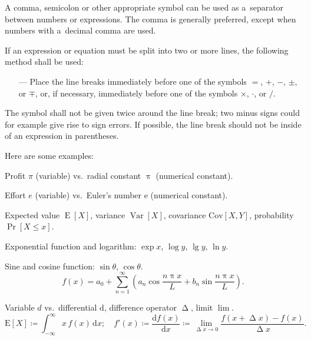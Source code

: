 \documentclass[12pt, a4paper, oneside]{article}
\newlength{\smalllinespacing}
\renewenvironment{quotation}{%
	\list{}{%
		\leftmargin = \baselineskip%
		\rightmargin = \leftmargin%
		\listparindent = \smalllinespacing%
		\parsep = 0pt%
		\baselineskip = \smalllinespacing%
	}%
	\item\relax%
}{%
	\endlist%
}
\newcommand{\dd}{\mathrm{d}}
\theoremstyle{Plain}
\theoremstyle{Definition}
\theoremstyle{Remark}
\begin{document}
\begin{quotation}
	A comma, semicolon or other appropriate symbol can be used as a~separator between numbers or expressions. The comma is generally preferred, except when numbers with a~decimal comma are used. \par
	If an expression or equation must be split into two or more lines, the following method shall be used:
	\begin{itemize}[leftmargin = \baselineskip, labelsep = 0.25\baselineskip]
		\item[---] Place the line breaks immediately before one of the symbols $=$, $+$, $-$, $\pm$, or $\mp$, or, if necessary, immediately before one of the symbols $\times$, $\cdot$, or $/$.
	\end{itemize}
	The symbol shall not be given twice around the line break; two minus signs could for example give rise to sign errors. If possible, the line break should not be inside of an expression in parentheses.
\end{quotation}

Here are some examples:
\begin{tcolorbox}[extras last = {bottom = -4ex}, extras unbroken = {bottom = -4ex}]
	\setlength{\parindent}{0pt}%
	Profit $\pi$ (variable) vs.\ radial constant $\uppi$ (numerical constant). \par
	Effort $e$ (variable) vs.\ Euler's number $\mathrm{e}$ (numerical constant). \par
	Expected value $\operatorname{E}[X]$, variance $\operatorname{Var}[X]$, covariance $\mathrm{Cov}[X, Y]$, probability $\Pr[{X \le x}]$. \par
	Exponential function and logarithm: $\exp x$, $\log y$, $\lg y$, $\ln y$. \par
	Sine and cosine function: $\sin \theta$, $\cos \theta$.
	\begin{equation}
		f(x) = a_0 + \sum_{n=1}^\infty \left(a_n \cos \frac{n \uppi x}{L} + b_n \sin \frac{n \uppi x}{L} \right).
	\end{equation} \par
	Variable $d$ vs.\ differential $\dd$, difference operator $\upDelta$, limit $\lim$.
	\begin{equation}
		\mathrm{E}[X] \coloneq \int_{-\infty}^{\infty} x\,f(x)\,\dd x; \quad
		f'(x) \coloneq \frac{\dd f(x)}{\dd x} \coloneq \lim_{\upDelta x \to 0} \frac{f(x + \upDelta x) - f(x)}{\upDelta x}.
	\end{equation}
\end{tcolorbox}

\pagebreak
\end{document}
